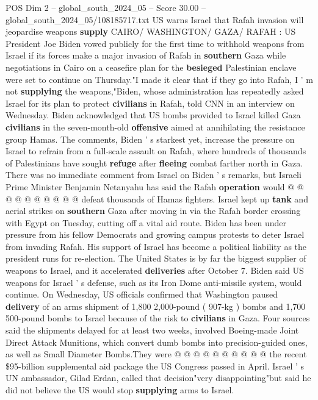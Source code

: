 \begin{textsample}{POS Dim 2 – global\_south\_2024\_05 – Score 30.00 – global\_south\_2024\_05/108185717.txt}  \label{ex:f2_pos_076}
US warns Israel that Rafah invasion will jeopardise weapons \textbf{supply} CAIRO/ WASHINGTON/ GAZA/ RAFAH : US President Joe Biden vowed publicly for the first time to withhold weapons from Israel if its forces make a major invasion of Rafah in \textbf{southern} Gaza while negotiations in Cairo on a ceasefire plan for the \textbf{besieged} Palestinian enclave were set to continue on Thursday."I made it clear that if they go into Rafah, I ' m not \textbf{supplying} the weapons,"Biden, whose administration has repeatedly asked Israel for its plan to protect \textbf{civilians} in Rafah, told CNN in an interview on Wednesday.
Biden acknowledged that US bombs provided to Israel killed Gaza \textbf{civilians} in the seven-month-old \textbf{offensive} aimed at annihilating the resistance group Hamas.
The comments, Biden ' s starkest yet, increase the pressure on Israel to refrain from a full-scale assault on Rafah, where hundreds of thousands of Palestinians have sought \textbf{refuge} after \textbf{fleeing} combat farther north in Gaza.
There was no immediate comment from Israel on Biden ' s remarks, but Israeli Prime Minister Benjamin Netanyahu has said the Rafah \textbf{operation} would @ @ @ @ @ @ @ @ @ @ defeat thousands of Hamas fighters.
Israel kept up \textbf{tank} and aerial strikes on \textbf{southern} Gaza after moving in via the Rafah border crossing with Egypt on Tuesday, cutting off a vital aid route.
Biden has been under pressure from his fellow Democrats and growing campus protests to deter Israel from invading Rafah.
His support of Israel has become a political liability as the president runs for re-election.
The United States is by far the biggest supplier of weapons to Israel, and it accelerated \textbf{deliveries} after October 7.
Biden said US weapons for Israel ' s defense, such as its Iron Dome anti-missile system, would continue.
On Wednesday, US officials confirmed that Washington paused \textbf{delivery} of an arms shipment of 1,800 2,000-pound ( 907-kg ) bombs and 1,700 500-pound bombs to Israel because of the risk to \textbf{civilians} in Gaza.
Four sources said the shipments delayed for at least two weeks, involved Boeing-made Joint Direct Attack Munitions, which convert dumb bombs into precision-guided ones, as well as Small Diameter Bombs.They were @ @ @ @ @ @ @ @ @ @ the recent \$95-billion supplemental aid package the US Congress passed in April.
Israel ' s UN ambassador, Gilad Erdan, called that decision"very disappointing"but said he did not believe the US would stop \textbf{supplying} arms to Israel.

\end{textsample}
